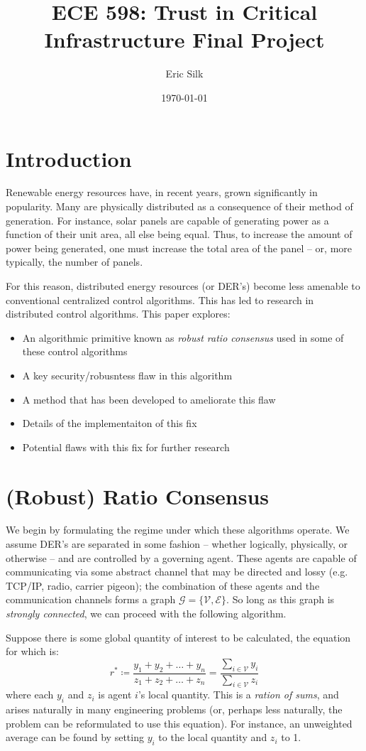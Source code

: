 \documentclass[11pt]{article}
\title{ECE 598: Trust in Critical Infrastructure Final Project}
\author{Eric Silk}
\date{\today}
\begin{document}
\maketitle
\tableofcontents
\pagebreak

\section{Introduction}
Renewable energy resources have, in recent years, grown significantly in
popularity. Many are physically distributed as a consequence of their method of
generation. For instance, solar panels are capable of generating power as a
function of their unit area, all else being equal.  Thus, to increase the amount
of power being generated, one must increase the total area of the panel -- or,
more typically, the number of panels.

For this reason, distributed energy resources (or DER's) become less amenable to
conventional centralized control algorithms. This has led to research in
distributed control algorithms. This paper explores:
\begin{itemize}
    \item An algorithmic primitive known as \textit{robust ratio consensus} used
          in some of these control algorithms
    \item A key security/robusntess flaw in this algorithm
    \item A method that has been developed to ameliorate this flaw
    \item Details of the implementaiton of this fix
    \item Potential flaws with this fix for further research
\end{itemize}
\section{(Robust) Ratio Consensus}
We begin by formulating the regime under which these algorithms operate. We
assume DER's are separated in some fashion -- whether logically, physically, or
otherwise -- and are controlled by a governing agent.  These agents are capable
of communicating via some abstract channel that may be directed and lossy (e.g.
TCP/IP, radio, carrier pigeon); the combination of these agents and the
communication channels forms a graph $\mathcal{G} = \{\mathcal{V},
    \mathcal{E}\}$.  So long as this graph is \textit{strongly connected}, we can
proceed with the following algorithm.

Suppose there is some global quantity of interest to be calculated, the equation
for which is:
\begin{equation}
    r^*
    \coloneqq \frac{y_1 + y_2 +\ldots + y_n}{z_1 + z_2 + \ldots + z_n}
    = \frac{\sum_{i\in\mathcal{V}}y_i}{\sum_{i\in\mathcal{V}}z_i}
\end{equation}
where each $y_i$ and $z_i$ is agent $i$'s local quantity.
This is a \textit{ration of sums}, and arises naturally in many engineering
problems (or, perhaps less naturally, the problem can be reformulated to use
this equation). For instance, an unweighted average can be found by setting
$y_i$ to the local quantity and $z_i$ to 1.
\end{document}
